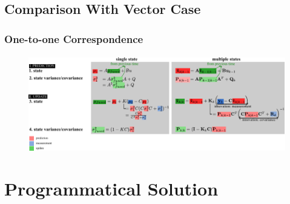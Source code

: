 \subsection{Comparison With Vector Case}
\begin{frame}\pw\Large
\frametitle{One-to-one Correspondence}
\framesubtitle{}
\begin{figure}[h]
\centering
\includegraphics[width=1.07\textwidth]{figs/TRK_KalmanFilter_equations-2D.pdf}
\end{figure}
\end{frame}




\section{Programmatical Solution}

